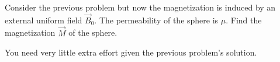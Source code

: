 \documentclass{phys151}
\begin{document}
\begin{solution}

\end{solution}

\begin{problem}
  Consider the previous problem but now the magnetization is induced by an
  external uniform field \(\vec B_0\).  The permeability of the sphere is
  \(\mu\).  Find the magnetization \(\vec M\) of the sphere.
  \begin{hint}
    You need very little extra effort given the previous problem's solution.
  \end{hint}
\end{problem}

\begin{solution}

\end{solution}
\end{document}
